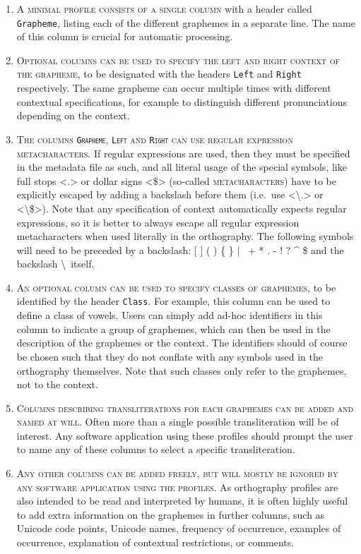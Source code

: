 \begin{enumerate}
	\def\labelenumi{A\arabic{enumi}.} \setcounter{enumi}{4} 
	\item \textsc{A minimal profile consists of a single column} with a header
       called \texttt{Grapheme}, listing each of the different graphemes in a
       separate line. The name of this column is crucial for automatic 
       processing.
	\item \textsc{Optional columns can be used to specify the left and right
       context of the grapheme}, to be designated with the headers \texttt{Left}
       and \texttt{Right} respectively. The same grapheme can occur multiple
       times with different contextual specifications, for example to
       distinguish different pronunciations depending on the context. 
	\item \textsc{The columns \texttt{Grapheme}, \texttt{Left} and \texttt{Right}
       can use regular expression metacharacters.} If regular expressions are
       used, then they must be specified in the metadata file as such, 
	   and all literal usage of the special symbols, like full stops <.>
       or dollar signs <\$> (so-called \textsc{metacharacters}) have to be
       explicitly escaped by adding a backslash before them (i.e.~use
       <\textbackslash.> or <\textbackslash\$>). Note that any specification of
       context automatically expects regular expressions, so it is 
       better to always escape all regular expression metacharacters when used
       literally in the orthography. The following symbols will need to be
       preceded by a backslash: {[} {]} ( ) \{ \} | ~+ * . - ! ? \^{} \$ and the
       backslash \textbackslash~itself. 
	\item \textsc{An optional column can be used to specify classes of graphemes},
       to be identified by the header \texttt{Class}. For example, this column
       can be used to define a class of vowels. Users can simply add ad-hoc
       identifiers in this column to indicate a group of graphemes, which can
       then be used in the description of the graphemes or the context. The
       identifiers should of course be chosen such that they do not conflate
       with any symbols used in the orthography themselves. Note that such
       classes only refer to the graphemes, not to the context. 
	\item \textsc{Columns describing transliterations for each graphemes can be
       added and named at will}. Often more than a single possible
       transliteration will be of interest. Any software application using these
       profiles should prompt the user to name any of these columns to select a
       specific transliteration. 
	\item \textsc{Any other columns can be added freely, but will mostly be ignored
       by any software application using the profiles}. As orthography profiles
       are also intended to be read and interpreted by humans, it is often
       highly useful to add extra information on the graphemes in further
       columns, such as Unicode code points, Unicode names, frequency of
       occurrence, examples of occurrence, explanation of contextual
       restrictions, or comments. 
 \end{enumerate}

